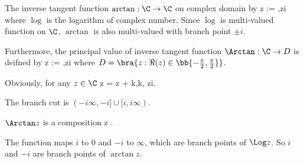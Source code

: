 \begin{definition}\label{def:inverse_tangent_function_complex}
The inverse tangent function $\arctan:\C\to \C$ on complex domain by
\be
\arctan z := \log{},\qquad z\neq\pm i
\ee
where $\log$ is the logarithm of complex number. Since $\log$ is multi-valued function on $\C$, $\arctan$ is also multi-valued with branch point $\pm i$.

Furthermore, the principal value of inverse tangent function $\Arctan:\C\to D$ is deifned by
\be
\Arctan z := \Log{},\qquad z\neq\pm i
\ee
where $D = \bra{z: \Re(z) \in \bb{-\frac{\pi}2,\frac{\pi}2}}$.

Obviously, for any $z\in \C$
\be
\arctan z = \Arctan z + k\pi ,\qquad  k\in \Z, \qquad z\neq \pm i.
\ee

The branch cut is $(-i \infty,-i]\cup [i,i\infty)$.  %
\end{definition}

\begin{remark}
$\Arctan z$ is a composition
\be
z \mapsto {} \mapsto {} \Log{}.
\ee

The function maps $i$ to 0 and $-i$ to $\infty$, which are branch points of $\Log z$. So $i$ and $-i$ are branch points of $\arctan z$.
\end{remark}

